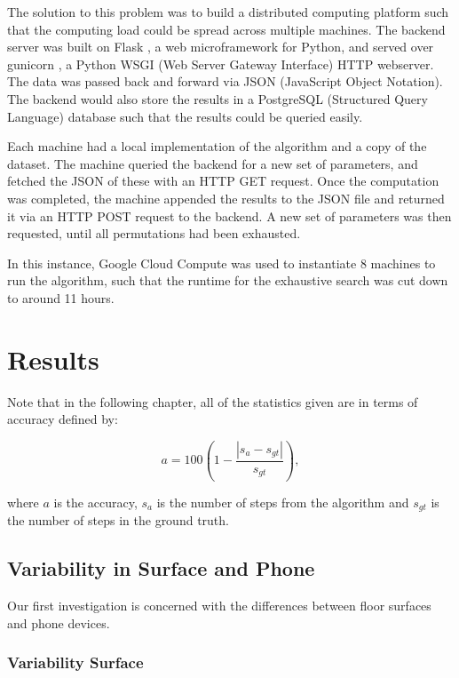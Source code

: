         The solution to this problem was to build a distributed computing platform such that the computing load could be spread across multiple machines. The backend server was built on Flask \cite{flask}, a web microframework for Python, and served over gunicorn \cite{gunicorn}, a Python WSGI (Web Server Gateway Interface) HTTP webserver. The data was passed back and forward via JSON (JavaScript Object Notation). The backend would also store the results in a PostgreSQL (Structured Query Language) database \cite{postgres} such that the results could be queried easily.

        Each machine had a local implementation of the algorithm and a copy of the dataset. The machine queried the backend for a new set of parameters, and fetched the JSON of these with an HTTP GET request. Once the computation was completed, the machine appended the results to the JSON file and returned it via an HTTP POST request to the backend. A new set of parameters was then requested, until all permutations had been exhausted.

        In this instance, Google Cloud Compute \cite{gcc} was used to instantiate 8 machines to run the algorithm, such that the runtime for the exhaustive search was cut down to around 11 hours.

    \chapter{Results}

        Note that in the following chapter, all of the statistics given are in terms of accuracy defined by:

        \begin{equation}
            a = 100(1 - \frac{|s_{a}-s_{gt}|}{s_{gt}}),
        \end{equation}

        where $a$ is the accuracy, $s_{a}$ is the number of steps from the algorithm and $s_{gt}$ is the number of steps in the ground truth.

        \section{Variability in Surface and Phone}

            Our first investigation is concerned with the differences between floor surfaces and phone devices. 

            \subsection{Variability Surface}

